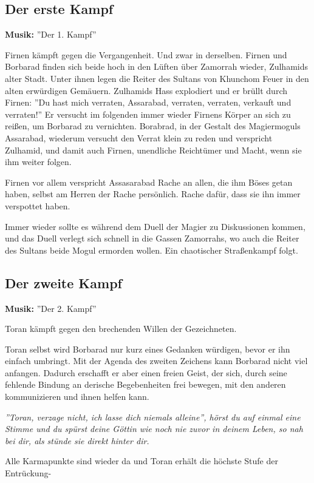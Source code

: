 \subsection{Der erste Kampf}
\textbf{Musik:} ''Der 1. Kampf''

Firnen kämpft gegen die Vergangenheit. Und zwar in derselben. Firnen und Borbarad finden sich beide hoch in den Lüften über Zamorrah wieder, Zulhamids alter Stadt. Unter ihnen legen die Reiter des Sultans von Khunchom Feuer in den alten erwürdigen Gemäuern. Zulhamids Hass explodiert und er brüllt durch Firnen: ''Du hast mich verraten, Assarabad, verraten, verraten, verkauft und verraten!'' Er versucht im folgenden immer wieder Firnens Körper an sich zu reißen, um Borbarad zu vernichten. Borabrad, in der Gestalt des Magiermoguls Assarabad, wiederum versucht den Verrat klein zu reden und verspricht Zulhamid, und damit auch Firnen, unendliche Reichtümer und Macht, wenn sie ihm weiter folgen.

Firnen vor allem verspricht Assasarabad Rache an allen, die ihm Böses getan haben, selbst am Herren der Rache persönlich. Rache dafür, dass sie ihn immer verspottet haben.

Immer wieder sollte es während dem Duell der Magier zu Diskussionen kommen, und das Duell verlegt sich schnell in die Gassen Zamorrahs, wo auch die Reiter des Sultans beide Mogul ermorden wollen. Ein chaotischer Straßenkampf folgt.

\subsection{Der zweite Kampf}
\textbf{Musik:} ''Der 2. Kampf''

Toran kämpft gegen den brechenden Willen der Gezeichneten. 

Toran selbst wird Borbarad nur kurz eines Gedanken würdigen, bevor er ihn einfach umbringt. Mit der Agenda des zweiten Zeichens kann Borbarad nicht viel anfangen. Dadurch erschafft er aber einen freien Geist, der sich, durch seine fehlende Bindung an derische Begebenheiten frei bewegen, mit den anderen kommunizieren und ihnen helfen kann.

\emph{''Toran, verzage nicht, ich lasse dich niemals alleine'', hörst du auf einmal eine Stimme und du spürst deine Göttin wie noch nie zuvor in deinem Leben, so nah bei dir, als stünde sie direkt hinter dir.}

Alle Karmapunkte sind wieder da und Toran erhält die höchste Stufe der Entrückung-

